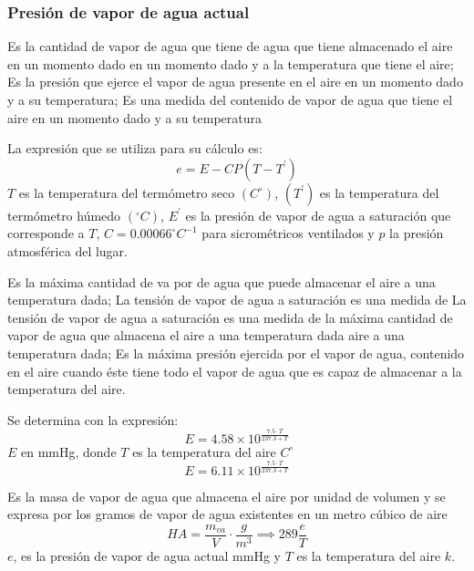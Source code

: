 \subsubsection{Presión de vapor de agua actual}
\begin{definition}
    Es la cantidad de vapor de agua que tiene de agua que tiene almacenado el aire en un momento dado en un momento dado y a la temperatura que tiene el aire;
    Es la presión que ejerce el vapor de agua presente en el aire en un momento dado y a su temperatura;
    Es una medida del contenido de vapor de agua que tiene el aire en un momento dado y a su temperatura
\end{definition}
La expresión que se utiliza para su cálculo es:
\begin{equation}
    e =E -CP\left(T - T^{\prime}\right)
\end{equation}
$T$ es la temperatura del termómetro seco $(C^{\circ})$, $(T^{\prime})$ es la temperatura del termómetro húmedo $(^{\circ}C)$, $E^{\prime}$ es la presión de vapor de agua a saturación que corresponde a $T$, $C=0.00066^{\circ}C^{-1}$ para sicrométricos ventilados y $p$ la presión atmosférica del lugar.

\begin{definition}
    Es la máxima cantidad de va por de agua que puede almacenar el aire a una temperatura dada;
La tensión de vapor de agua a saturación es una medida de La tensión de vapor de agua a saturación es una medida de la máxima cantidad de vapor de agua que almacena el aire a una temperatura dada aire a una temperatura dada;
Es la máxima presión ejercida por el vapor de agua,  contenido en el aire cuando éste tiene todo el vapor de agua que es capaz de almacenar a la temperatura del aire.
\end{definition}

Se determina con la expresión:
\begin{equation}
    E = 4.58 \times 10^{ \frac{7.5 \cdot T}{237.3 +T}}
\end{equation}
$E$ en mmHg, donde $T$ es la temperatura del aire $C^{\circ}$
\begin{equation}
    E = 6.11 \times 10^{ \frac{7.5 \cdot T}{237.3 +T}}
\end{equation}

\begin{definition}
    Es la masa de vapor de agua que almacena el aire por unidad de volumen y se expresa por los gramos de vapor de agua existentes en un metro cúbico de aire 
    \begin{equation}
        HA =\frac{m_{va}}{V} \cdot\frac{g}{m^3}\implies 289\frac{e}{T}
    \end{equation}
    $e$, es la presión de vapor de agua actual mmHg y $T$ es la temperatura del aire $k$.
\end{definition}

